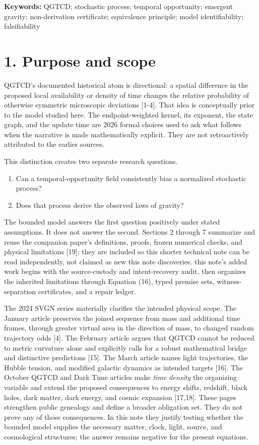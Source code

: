 \documentclass[
  american,
  11pt,
  letterpaper,
]{article}
\providecommand{\tightlist}{%
  \setlength{\itemsep}{0pt}\setlength{\parskip}{0pt}}
\begin{document}
\noindent\textbf{Keywords:} QGTCD; stochastic process; temporal opportunity; emergent gravity; non-derivation certificate; equivalence principle; model identifiability; falsifiability

\section{1. Purpose and scope}\label{purpose-and-scope}

QGTCD's documented historical atom is directional: a spatial difference in the proposed local availability or density of time changes the relative probability of otherwise symmetric microscopic deviations {[}1-4{]}. That idea is conceptually prior to the model studied here. The endpoint-weighted kernel, its exponent, the state graph, and the update time are 2026 formal choices used to ask what follows when the narrative is made mathematically explicit. They are not retroactively attributed to the earlier sources.

This distinction creates two separate research questions.

\begin{enumerate}
\def\labelenumi{\arabic{enumi}.}
\tightlist
\item
  Can a temporal-opportunity field consistently bias a normalized stochastic process?
\item
  Does that process derive the observed laws of gravity?
\end{enumerate}

The bounded model answers the first question positively under stated assumptions. It does not answer the second. Sections 2 through 7 summarize and reuse the companion paper's definitions, proofs, frozen numerical checks, and physical limitations {[}19{]}; they are included so this shorter technical note can be read independently, not claimed as new this note discoveries. this note's added work begins with the source-custody and intent-recovery audit, then organizes the inherited limitations through Equation (16), typed premise sets, witness-separation certificates, and a repair ledger.

The 2024 SVGN series materially clarifies the intended physical scope. The January article preserves the joined sequence from mass and additional time frames, through greater virtual area in the direction of mass, to changed random trajectory odds {[}4{]}. The February article argues that QGTCD cannot be reduced to metric curvature alone and explicitly calls for a robust mathematical bridge and distinctive predictions {[}15{]}. The March article names light trajectories, the Hubble tension, and modified galactic dynamics as intended targets {[}16{]}. The October QGTCD and Dark Time articles make \emph{time density} the organizing variable and extend the proposed consequences to energy shifts, redshift, black holes, dark matter, dark energy, and cosmic expansion {[}17,18{]}. These pages strengthen public genealogy and define a broader obligation set. They do not prove any of those consequences. In this note they justify testing whether the bounded model supplies the necessary matter, clock, light, source, and cosmological structures; the answer remains negative for the present equations.
\end{document}
